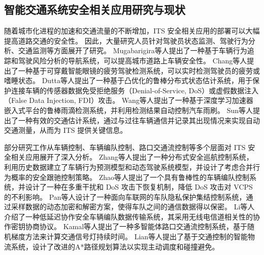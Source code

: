 \subsection{智能交通系统安全相关应用研究与现状}

随着城市化进程的加速和交通流量的不断增加，ITS 安全相关应用的部署可以大幅提高道路交通的安全性。
因此，大量研究人员针对驾驶员状态监测、驾驶行为分析、交通监测等方面展开了研究。
Mugabarigira等人\cite{mugabarigira2023context}提出了一种基于车辆行为追踪和驾驶风险分析的导航系统，可以提高城市道路上车辆安全性。
Chang等人\cite{chang2018design}提出了一种基于可穿戴智能眼镜的疲劳驾驶检测系统，可以实时检测驾驶员的疲劳或嗜睡状态。
Dutta等人\cite{dutta2022design}提出了一种基于凸优化的鲁棒分布式状态估计系统，用于保护连接车辆的传感器数据免受拒绝服务（Denial-of-Service, DoS）或虚假数据注入（False Data Injection, FDI）攻击。
Wang等人\cite{wang2021deep}提出了一种基于深度学习加速器嵌入式平台的鲁棒雨滴检测系统，并利用检测结果自动控制汽车雨刷。
Sun等人\cite{sun2022toward}提出了一种有效的交通估计系统，通过与过往车辆通信并记录其出现情况来实现自动交通测量，从而为 ITS 提供关键信息。

部分研究工作从车辆控制、车辆编队控制、路口交通流控制等多个层面对 ITS 安全相关应用展开了深入分析。
Zhang等人\cite{zhang2021data}提出了一种分布式安全巡航控制系统，利用历史数据建立了车辆行为预测模型和动态驾驶系统模型，并设计了考虑合并行为概率的安全跟驰控制策略。
Zhao等人\cite{zhao2022resilient}提出了一个具有鲁棒性的车辆编队控制系统，并设计了一种在多重干扰和 DoS 攻击下恢复机制，降低 DoS 攻击对 VCPS 的不利影响。
Pan等人\cite{pan2023privacy}设计了一种面向车联网的车队隐私保护集结控制系统，通过采样数据的动态加密和解密方案，使得车队之间的通信数据得以保密。
Li等人\cite{li2021confidenitality}介绍了一种低延迟协作安全车辆编队数据传输系统，其采用无线电信道相关性的协作密钥协商协议。
Kamal等人\cite{kamal2021control}提出了一种多智能体路口交通流控制系统，基于随机梯度方法来计算交通信号灯持续时间。
Lian等人\cite{lian2021cyber}提出了基于交通控制的智能物流系统，设计了改进的A*路径规划算法以实现主动调度和碰撞避免。

